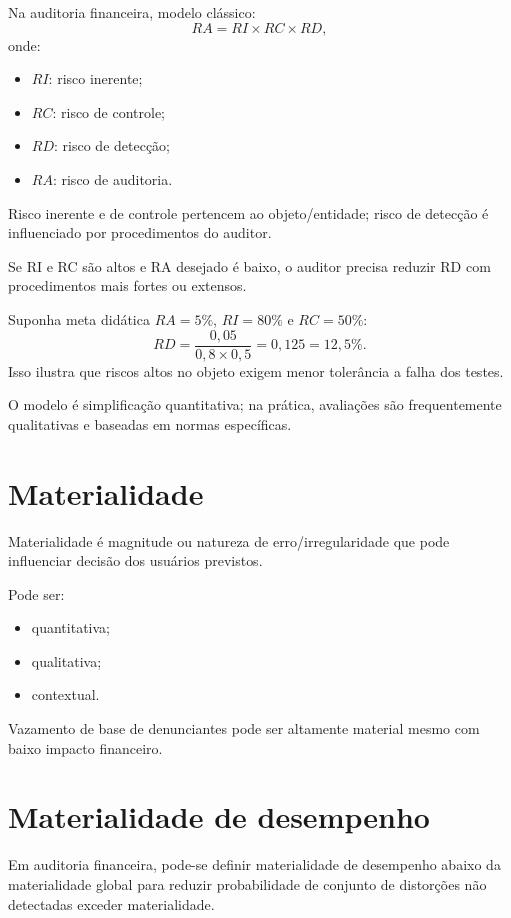 Na auditoria financeira, modelo clássico:
\[
RA=RI\times RC\times RD,
\]
onde:
\begin{itemize}
\item $RI$: risco inerente;
\item $RC$: risco de controle;
\item $RD$: risco de detecção;
\item $RA$: risco de auditoria.
\end{itemize}

Risco inerente e de controle pertencem ao objeto/entidade; risco de detecção é influenciado por procedimentos do auditor.

Se RI e RC são altos e RA desejado é baixo, o auditor precisa reduzir RD com procedimentos mais fortes ou extensos.

\begin{exemplo}
Suponha meta didática $RA=5\%$, $RI=80\%$ e $RC=50\%$:
\[
RD=\frac{0{,}05}{0{,}8\times0{,}5}=0{,}125=12{,}5\%.
\]
Isso ilustra que riscos altos no objeto exigem menor tolerância a falha dos testes.
\end{exemplo}

O modelo é simplificação quantitativa; na prática, avaliações são frequentemente qualitativas e baseadas em normas específicas.

\section{Materialidade}

Materialidade é magnitude ou natureza de erro/irregularidade que pode influenciar decisão dos usuários previstos.

Pode ser:
\begin{itemize}
\item quantitativa;
\item qualitativa;
\item contextual.
\end{itemize}

Vazamento de base de denunciantes pode ser altamente material mesmo com baixo impacto financeiro.

\section{Materialidade de desempenho}

Em auditoria financeira, pode-se definir materialidade de desempenho abaixo da materialidade global para reduzir probabilidade de conjunto de distorções não detectadas exceder materialidade.

